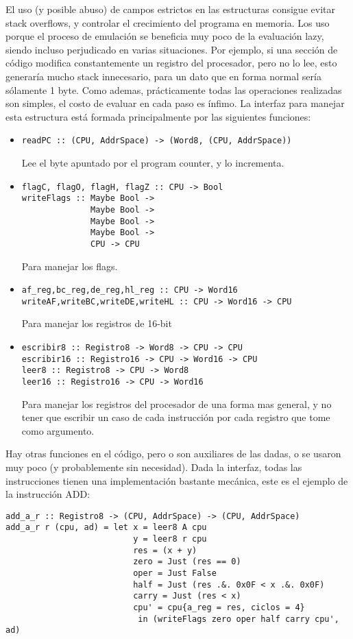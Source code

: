 \documentclass[a4paper,10pt]{report}
\begin{document}
El uso (y posible abuso) de campos estrictos en las estructuras consigue evitar stack overflows, y controlar el crecimiento del programa en memoria. Los uso porque el proceso de emulación se beneficia muy poco de la evaluación lazy, siendo incluso perjudicado en varias situaciones. Por ejemplo, si una sección de código modifica constantemente un registro del procesador, pero no lo lee, esto generaría mucho stack innecesario, para un dato que en forma normal sería sólamente 1 byte. Como ademas, prácticamente todas las operaciones realizadas son simples, el costo de evaluar en cada paso es ínfimo.
La interfaz para manejar esta estructura está formada principalmente por las siguientes funciones:
\begin{itemize}
  \item \begin{verbatim}
readPC :: (CPU, AddrSpace) -> (Word8, (CPU, AddrSpace))
  \end{verbatim}
  Lee el byte apuntado por el program counter, y lo incrementa.
  \item \begin{verbatim}
flagC, flagO, flagH, flagZ :: CPU -> Bool
writeFlags :: Maybe Bool -> 
              Maybe Bool -> 
              Maybe Bool -> 
              Maybe Bool -> 
              CPU -> CPU
        \end{verbatim}
    Para manejar los flags.
   \item \begin{verbatim}
af_reg,bc_reg,de_reg,hl_reg :: CPU -> Word16
writeAF,writeBC,writeDE,writeHL :: CPU -> Word16 -> CPU
   \end{verbatim}
   Para manejar los registros de 16-bit
   \item \begin{verbatim}
escribir8 :: Registro8 -> Word8 -> CPU -> CPU
escribir16 :: Registro16 -> CPU -> Word16 -> CPU
leer8 :: Registro8 -> CPU -> Word8
leer16 :: Registro16 -> CPU -> Word16
   \end{verbatim}
    Para manejar los registros del procesador de una forma mas general, y no tener que escribir un caso de cada instrucción por cada registro que tome como argumento.
\end{itemize}
\clearpage
Hay otras funciones en el código, pero o son auxiliares de las dadas, o se usaron muy poco (y probablemente sin necesidad).
Dada la interfaz, todas las instrucciones tienen una implementación bastante mecánica, este es el ejemplo de la instrucción ADD:\begin{verbatim}
add_a_r :: Registro8 -> (CPU, AddrSpace) -> (CPU, AddrSpace)
add_a_r r (cpu, ad) = let x = leer8 A cpu
                          y = leer8 r cpu
                          res = (x + y)
                          zero = Just (res == 0)
                          oper = Just False
                          half = Just (res .&. 0x0F < x .&. 0x0F)
                          carry = Just (res < x)
                          cpu' = cpu{a_reg = res, ciclos = 4}
                           in (writeFlags zero oper half carry cpu', ad)
\end{verbatim}
\end{document}
